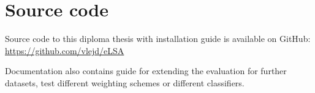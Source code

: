 \chapter{Source code}
\label{appendix:code}

Source code to this diploma thesis with installation guide is available on GitHub: 
\url{https://github.com/vlejd/eLSA}

Documentation also contains guide for extending the evaluation for further datasets, test different weighting schemes or different classifiers.
